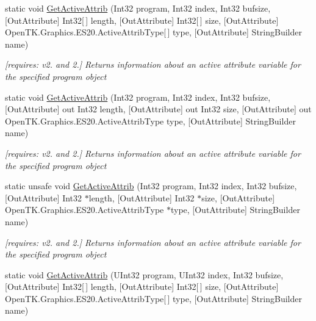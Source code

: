 \begin{DoxyCompactItemize}
static void \hyperlink{class_open_t_k_1_1_graphics_1_1_e_s20_1_1_g_l_a24700ce2596523017a3edff579359858}{Get\-Active\-Attrib} (Int32 program, Int32 index, Int32 bufsize, \mbox{[}Out\-Attribute\mbox{]} Int32\mbox{[}$\,$\mbox{]} length, \mbox{[}Out\-Attribute\mbox{]} Int32\mbox{[}$\,$\mbox{]} size, \mbox{[}Out\-Attribute\mbox{]} Open\-T\-K.\-Graphics.\-E\-S20.\-Active\-Attrib\-Type\mbox{[}$\,$\mbox{]} type, \mbox{[}Out\-Attribute\mbox{]} String\-Builder name)
\begin{DoxyCompactList}\small\item\em \mbox{[}requires\-: v2. and 2.\mbox{]} Returns information about an active attribute variable for the specified program object \end{DoxyCompactList}\item 
static void \hyperlink{class_open_t_k_1_1_graphics_1_1_e_s20_1_1_g_l_a311e03ee4e740f67bd10873ea4d749fe}{Get\-Active\-Attrib} (Int32 program, Int32 index, Int32 bufsize, \mbox{[}Out\-Attribute\mbox{]} out Int32 length, \mbox{[}Out\-Attribute\mbox{]} out Int32 size, \mbox{[}Out\-Attribute\mbox{]} out Open\-T\-K.\-Graphics.\-E\-S20.\-Active\-Attrib\-Type type, \mbox{[}Out\-Attribute\mbox{]} String\-Builder name)
\begin{DoxyCompactList}\small\item\em \mbox{[}requires\-: v2. and 2.\mbox{]} Returns information about an active attribute variable for the specified program object \end{DoxyCompactList}\item 
static unsafe void \hyperlink{class_open_t_k_1_1_graphics_1_1_e_s20_1_1_g_l_ade8deeda2f540552fd091dc2588bb31a}{Get\-Active\-Attrib} (Int32 program, Int32 index, Int32 bufsize, \mbox{[}Out\-Attribute\mbox{]} Int32 $\ast$length, \mbox{[}Out\-Attribute\mbox{]} Int32 $\ast$size, \mbox{[}Out\-Attribute\mbox{]} Open\-T\-K.\-Graphics.\-E\-S20.\-Active\-Attrib\-Type $\ast$type, \mbox{[}Out\-Attribute\mbox{]} String\-Builder name)
\begin{DoxyCompactList}\small\item\em \mbox{[}requires\-: v2. and 2.\mbox{]} Returns information about an active attribute variable for the specified program object \end{DoxyCompactList}\item 
static void \hyperlink{class_open_t_k_1_1_graphics_1_1_e_s20_1_1_g_l_aa6d9a79544d99272fa890922a2c0e960}{Get\-Active\-Attrib} (U\-Int32 program, U\-Int32 index, Int32 bufsize, \mbox{[}Out\-Attribute\mbox{]} Int32\mbox{[}$\,$\mbox{]} length, \mbox{[}Out\-Attribute\mbox{]} Int32\mbox{[}$\,$\mbox{]} size, \mbox{[}Out\-Attribute\mbox{]} Open\-T\-K.\-Graphics.\-E\-S20.\-Active\-Attrib\-Type\mbox{[}$\,$\mbox{]} type, \mbox{[}Out\-Attribute\mbox{]} String\-Builder name)

\end{DoxyCompactItemize}
